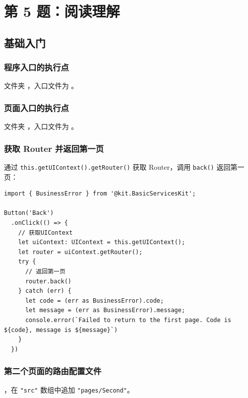\documentclass[a4paper, 12pt, linespread=1.35]{ctexart}   %
\newcommand{\keepwithnext}{\par\nobreak}
\begin{document}
\section{第 5 题：阅读理解}
\label{sec:q5}

\subsection{基础入门}

\subsubsection{程序入口的执行点}

文件夹 ，入口文件为 。

\subsubsection{页面入口的执行点}

文件夹 ，入口文件为 。

\subsubsection{获取 Router 并返回第一页}

通过 \texttt{this.getUIContext().getRouter()} 获取 Router，调用 \texttt{back()} 返回第一页：\keepwithnext

\begin{lstlisting}
import { BusinessError } from '@kit.BasicServicesKit';

Button('Back')
  .onClick(() => {
    // 获取UIContext
    let uiContext: UIContext = this.getUIContext();
    let router = uiContext.getRouter();
    try {
      // 返回第一页
      router.back()
    } catch (err) {
      let code = (err as BusinessError).code;
      let message = (err as BusinessError).message;
      console.error(`Failed to return to the first page. Code is ${code}, message is ${message}`)
    }
  })
\end{lstlisting}

\subsubsection{第二个页面的路由配置文件}

，在 \texttt{"src"} 数组中追加 \texttt{"pages/Second"}。
\end{document}
